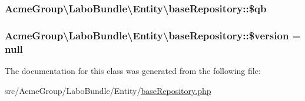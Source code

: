 \hypertarget{class_acme_group_1_1_labo_bundle_1_1_entity_1_1base_repository_aa0bbe6a08ba9c0c8d2ca667370b83619}{
\subsubsection[{\$qb}]{\setlength{\rightskip}{0pt plus 5cm}Acme\+Group\textbackslash{}\+Labo\+Bundle\textbackslash{}\+Entity\textbackslash{}base\+Repository\+::\$qb\hspace{0.3cm}{\ttfamily [protected]}}}\label{class_acme_group_1_1_labo_bundle_1_1_entity_1_1base_repository_aa0bbe6a08ba9c0c8d2ca667370b83619}
\hypertarget{class_acme_group_1_1_labo_bundle_1_1_entity_1_1base_repository_a97ddd0d790492e38d0fb0be332917605}{
\subsubsection[{\$version}]{\setlength{\rightskip}{0pt plus 5cm}Acme\+Group\textbackslash{}\+Labo\+Bundle\textbackslash{}\+Entity\textbackslash{}base\+Repository\+::\$version = {\bf null}\hspace{0.3cm}{\ttfamily [protected]}}}\label{class_acme_group_1_1_labo_bundle_1_1_entity_1_1base_repository_a97ddd0d790492e38d0fb0be332917605}


The documentation for this class was generated from the following file\+:\begin{DoxyCompactItemize}
\item 
src/\+Acme\+Group/\+Labo\+Bundle/\+Entity/\hyperlink{base_repository_8php}{base\+Repository.\+php}\end{DoxyCompactItemize}
